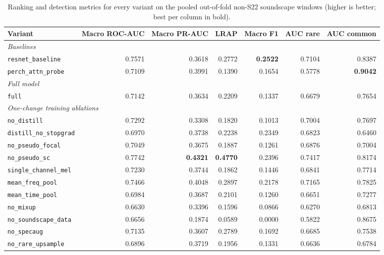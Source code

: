 \begin{table}[H]\centering\small
\caption{Ranking and detection metrics for every variant on the pooled out-of-fold non-S22 soundscape windows (higher is better; best per column in bold).}\label{tab:main_rank}
\setlength{\tabcolsep}{3.5pt}
\begin{adjustbox}{max width=\linewidth}
\begin{tabular}{lrrrrrr}
\toprule
Variant & Macro ROC-AUC & Macro PR-AUC & LRAP & Macro F1 & AUC rare & AUC common \\
\midrule
\multicolumn{7}{l}{\emph{Baselines}} \\
\texttt{resnet\_baseline} & 0.7571 & 0.3618 & 0.2772 & \textbf{0.2522} & 0.7104 & 0.8387 \\
\texttt{perch\_attn\_probe} & 0.7109 & 0.3991 & 0.1390 & 0.1654 & 0.5778 & \textbf{0.9042} \\
\midrule
\multicolumn{7}{l}{\emph{Full model}} \\
\texttt{full} & 0.7142 & 0.3634 & 0.2209 & 0.1337 & 0.6679 & 0.7654 \\
\midrule
\multicolumn{7}{l}{\emph{One-change training ablations}} \\
\texttt{no\_distill} & 0.7292 & 0.3308 & 0.1820 & 0.1013 & 0.7004 & 0.7697 \\
\texttt{distill\_no\_stopgrad} & 0.6970 & 0.3738 & 0.2238 & 0.2349 & 0.6823 & 0.6460 \\
\texttt{no\_pseudo\_focal} & 0.7049 & 0.3675 & 0.1887 & 0.1261 & 0.6876 & 0.7004 \\
\texttt{no\_pseudo\_sc} & 0.7742 & \textbf{0.4321} & \textbf{0.4770} & 0.2396 & 0.7417 & 0.8174 \\
\texttt{single\_channel\_mel} & 0.7230 & 0.3744 & 0.1862 & 0.1446 & 0.6841 & 0.7714 \\
\texttt{mean\_freq\_pool} & 0.7466 & 0.4048 & 0.2897 & 0.2178 & 0.7165 & 0.7825 \\
\texttt{mean\_time\_pool} & 0.6984 & 0.3687 & 0.2101 & 0.1260 & 0.6651 & 0.7277 \\
\texttt{no\_mixup} & 0.6630 & 0.3396 & 0.1596 & 0.0866 & 0.6270 & 0.6813 \\
\texttt{no\_soundscape\_data} & 0.6656 & 0.1874 & 0.0589 & 0.0000 & 0.5822 & 0.8675 \\
\texttt{no\_specaug} & 0.7135 & 0.3607 & 0.2789 & 0.1692 & 0.6685 & 0.7538 \\
\texttt{no\_rare\_upsample} & 0.6896 & 0.3719 & 0.1956 & 0.1331 & 0.6636 & 0.6784 \\
\midrule

\end{tabular}
\end{adjustbox}
\end{table}
